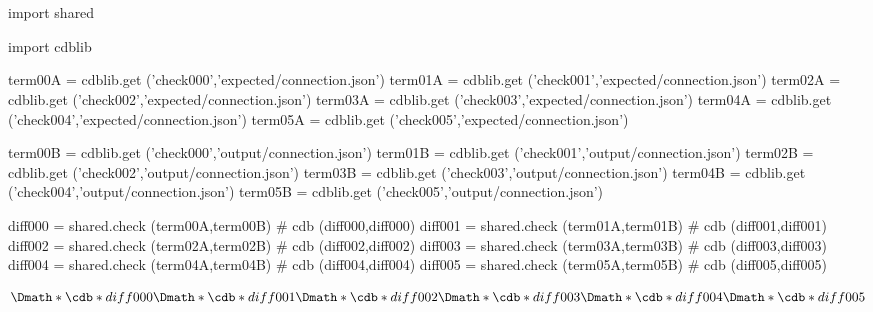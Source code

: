\documentclass[12pt]{cdblatex}
\begin{document}
\section*{\jobname}


\begin{cadabra}
   import shared

   import cdblib

   term00A = cdblib.get ('check000','expected/connection.json')
   term01A = cdblib.get ('check001','expected/connection.json')
   term02A = cdblib.get ('check002','expected/connection.json')
   term03A = cdblib.get ('check003','expected/connection.json')
   term04A = cdblib.get ('check004','expected/connection.json')
   term05A = cdblib.get ('check005','expected/connection.json')

   term00B = cdblib.get ('check000','output/connection.json')
   term01B = cdblib.get ('check001','output/connection.json')
   term02B = cdblib.get ('check002','output/connection.json')
   term03B = cdblib.get ('check003','output/connection.json')
   term04B = cdblib.get ('check004','output/connection.json')
   term05B = cdblib.get ('check005','output/connection.json')

   diff000 = shared.check (term00A,term00B)   # cdb (diff000,diff000)
   diff001 = shared.check (term01A,term01B)   # cdb (diff001,diff001)
   diff002 = shared.check (term02A,term02B)   # cdb (diff002,diff002)
   diff003 = shared.check (term03A,term03B)   # cdb (diff003,diff003)
   diff004 = shared.check (term04A,term04B)   # cdb (diff004,diff004)
   diff005 = shared.check (term05A,term05B)   # cdb (diff005,diff005)

\end{cadabra}

\begin{dgroup*}
   \Dmath*{ \cdb*{diff000} }
   \Dmath*{ \cdb*{diff001} }
   \Dmath*{ \cdb*{diff002} }
   \Dmath*{ \cdb*{diff003} }
   \Dmath*{ \cdb*{diff004} }
   \Dmath*{ \cdb*{diff005} }
\end{dgroup*}
\end{document}
